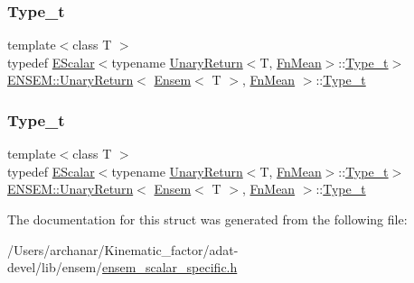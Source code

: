\subsubsection{\texorpdfstring{Type\_t}{Type\_t}\hspace{0.1cm}{\footnotesize\ttfamily [2/3]}}
{\footnotesize\ttfamily template$<$class T $>$ \\
typedef \mbox{\hyperlink{classENSEM_1_1EScalar}{E\+Scalar}}$<$typename \mbox{\hyperlink{structENSEM_1_1UnaryReturn}{Unary\+Return}}$<$T, \mbox{\hyperlink{structENSEM_1_1FnMean}{Fn\+Mean}}$>$\+::\mbox{\hyperlink{structENSEM_1_1UnaryReturn_3_01Ensem_3_01T_01_4_00_01FnMean_01_4_aecb00ba039f774eb3f7e9c0d788867a6}{Type\+\_\+t}}$>$ \mbox{\hyperlink{structENSEM_1_1UnaryReturn}{E\+N\+S\+E\+M\+::\+Unary\+Return}}$<$ \mbox{\hyperlink{classENSEM_1_1Ensem}{Ensem}}$<$ T $>$, \mbox{\hyperlink{structENSEM_1_1FnMean}{Fn\+Mean}} $>$\+::\mbox{\hyperlink{structENSEM_1_1UnaryReturn_3_01Ensem_3_01T_01_4_00_01FnMean_01_4_aecb00ba039f774eb3f7e9c0d788867a6}{Type\+\_\+t}}}

\mbox{\label{structENSEM_1_1UnaryReturn_3_01Ensem_3_01T_01_4_00_01FnMean_01_4_aecb00ba039f774eb3f7e9c0d788867a6}} 
\subsubsection{\texorpdfstring{Type\_t}{Type\_t}\hspace{0.1cm}{\footnotesize\ttfamily [3/3]}}
{\footnotesize\ttfamily template$<$class T $>$ \\
typedef \mbox{\hyperlink{classENSEM_1_1EScalar}{E\+Scalar}}$<$typename \mbox{\hyperlink{structENSEM_1_1UnaryReturn}{Unary\+Return}}$<$T, \mbox{\hyperlink{structENSEM_1_1FnMean}{Fn\+Mean}}$>$\+::\mbox{\hyperlink{structENSEM_1_1UnaryReturn_3_01Ensem_3_01T_01_4_00_01FnMean_01_4_aecb00ba039f774eb3f7e9c0d788867a6}{Type\+\_\+t}}$>$ \mbox{\hyperlink{structENSEM_1_1UnaryReturn}{E\+N\+S\+E\+M\+::\+Unary\+Return}}$<$ \mbox{\hyperlink{classENSEM_1_1Ensem}{Ensem}}$<$ T $>$, \mbox{\hyperlink{structENSEM_1_1FnMean}{Fn\+Mean}} $>$\+::\mbox{\hyperlink{structENSEM_1_1UnaryReturn_3_01Ensem_3_01T_01_4_00_01FnMean_01_4_aecb00ba039f774eb3f7e9c0d788867a6}{Type\+\_\+t}}}



The documentation for this struct was generated from the following file\+:\begin{DoxyCompactItemize}
\item 
/\+Users/archanar/\+Kinematic\+\_\+factor/adat-\/devel/lib/ensem/\mbox{\hyperlink{adat-devel_2lib_2ensem_2ensem__scalar__specific_8h}{ensem\+\_\+scalar\+\_\+specific.\+h}}\end{DoxyCompactItemize}
